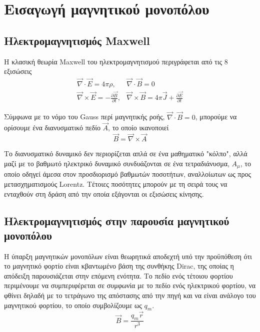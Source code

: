 \section{Εισαγωγή μαγνητικού μονοπόλου}
\subsection{Ηλεκτρομαγνητισμός Maxwell}
Η κλασική θεωρία Maxwell του ηλεκτρομαγνητισμού περιγράφεται από τις 8 εξισώσεις
\begin{equation}\begin{array}{ll}
        \Vec{\nabla} \cdot \Vec{E} = 4\pi \rho, & \Vec{\nabla} \cdot \Vec{B} = 0 \\
        \Vec{\nabla} \times \Vec{E} = - \frac{\partial \Vec{B}}{\partial t}, & \Vec{\nabla} \times \Vec{B} = 4\pi \Vec{J} + \frac{\partial \Vec{E}}{\partial t}
    \end{array}
\end{equation}

\noindent Σύμφωνα με το νόμο του Gauss περί μαγνητικής ροής, $\Vec{\nabla} \cdot \vec{B} = 0$, μπορούμε να ορίσουμε ένα διανυσματικό πεδίο $\vec{A}$, το οποίο ικανοποιεί 
\begin{equation}\label{curl}
    \vec{B} = \vec{\nabla} \times \vec{A}
\end{equation}

\noindent Το διανυσματικό δυναμικό δεν περιορίζεται απλά σε ένα μαθηματικό "κόλπο", αλλά μαζί με το βαθμωτό ηλεκτρικό δυναμικό συνδυάζονται σε ένα τετραδιάνυσμα, $A_{\mu}$, το οποίο οδηγεί άμεσα στον προσδιορισμό βαθμωτών ποσοτήτων, αναλλοίωτων ως προς μετασχηματισμούς Lorentz. 
Τέτοιες ποσότητες μπορούν με τη σειρά τους να ενταχθούν στη δράση από την οποία εξάγονται οι εξισώσεις κίνησης. \\


\subsection{Ηλεκτρομαγνητισμός στην παρουσία μαγνητικού μονοπόλου}
\noindent Η ύπαρξη μαγνητικών μονοπόλων είναι θεωρητικά αποδεχτή υπό την προϋπόθεση ότι το μαγνητικό φορτίο είναι κβαντωμένο βάση της συνθήκης Dirac, της οποίας η απόδειξη παρουσιάζεται στην επόμενη ενότητα. Το πεδίο ενός τέτοιου φορτίου περιμένουμε να συμπεριφέρεται σε συμφωνία με το πεδίο ενός ηλεκτρικού φορτίου, να φθίνει δηλαδή με το τετράγωνο της απόστασης από την πηγή και να είναι ανάλογο του μαγνητικού φορτίου, το οποίο συμβολίζουμε ως $q_m$. 
\begin{equation}\label{centralB}
    \vec{B} = \frac{q_m \vec{r}}{r^3}
\end{equation}

